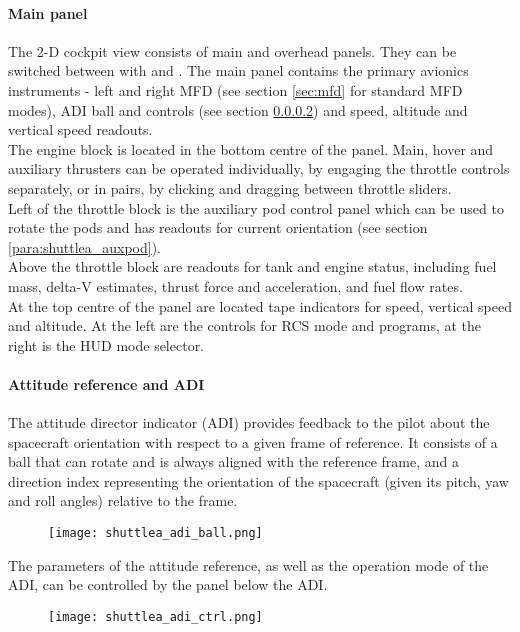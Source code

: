 \documentclass[Orbiter User Manual.tex]{subfiles}
\begin{document}
\paragraph{Main panel}
The 2-D cockpit view consists of main and overhead panels. They can be switched between with \Ctrl\UArrow and \Ctrl\DArrow. The main panel contains the primary avionics instruments - left and right MFD (see section \ref{sec:mfd} for standard MFD modes), ADI ball and controls (see section \ref{para:shuttlea_adi}) and speed, altitude and vertical speed readouts.\\
The engine block is located in the bottom centre of the panel. Main, hover and auxiliary thrusters can be operated individually, by engaging the throttle controls separately, or in pairs, by clicking and dragging between throttle sliders.\\
Left of the throttle block is the auxiliary pod control panel which can be used to rotate the pods and has readouts for current orientation (see section \ref{para:shuttlea_auxpod}).\\
Above the throttle block are readouts for tank and engine status, including fuel mass, delta-V estimates, thrust force and acceleration, and fuel flow rates.\\
At the top centre of the panel are located tape indicators for speed, vertical speed and altitude. At the left are the controls for RCS mode and programs, at the right is the HUD mode selector.

\paragraph{Attitude reference and ADI}
\label{para:shuttlea_adi}
The attitude director indicator (ADI) provides feedback to the pilot about the spacecraft orientation with respect to a given frame of reference. It consists of a ball that can rotate and is always aligned with the reference frame, and a direction index representing the orientation of the spacecraft (given its pitch, yaw and roll angles) relative to the frame.

\begin{figure}[H]
  \centering
  \texttt{[image: shuttlea\_adi\_ball.png]}
\end{figure}

\noindent
The parameters of the attitude reference, as well as the operation mode of the ADI, can be controlled by the panel below the ADI.

\begin{figure}[H]
  \centering
  \texttt{[image: shuttlea\_adi\_ctrl.png]}
\end{figure}
\end{document}
